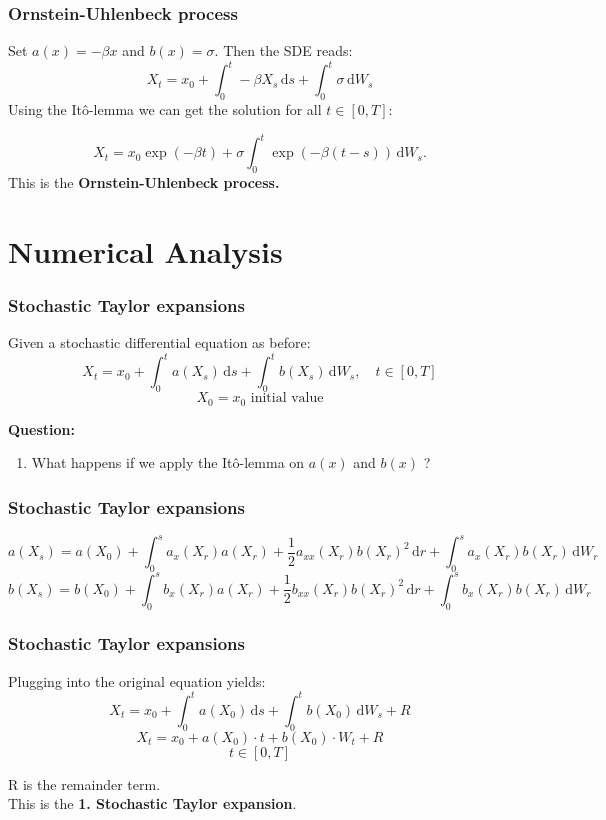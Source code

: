 \begin{frame}
\frametitle{Ornstein-Uhlenbeck process}
Set \(a(x) = -\beta x\) and \(b(x) = \sigma\). Then the SDE reads:
\[ X_t = x_0 + \int_0^t \!-\beta X_s\,\mathrm{d}s + \int_0^t \!\sigma\,\mathrm{d}W_{s}\]
Using the It\^o-lemma we can get the solution for all \(t\in[0,T]\):

\[X_t = x_0\exp({-\beta t}) + \sigma\int_0^t \!\exp({-\beta(t-s)})\,\mathrm{d}W_{s}.\]
This is the \textbf{Ornstein-Uhlenbeck process.}

\end{frame}



\section{Numerical Analysis} 

\begin{frame}
\frametitle{Stochastic Taylor expansions}
Given a stochastic differential equation as before:
\[X_t = x_0 + \int_0^t \!a(X_s)\,\mathrm{d}s + \int_0^t \!b(X_s)\,\mathrm{d}W_{s},\quad t\in [0,T]\]
\[X_0 = x_0\,\,\text{initial value}\]

\textbf{Question:}
\begin{enumerate}
\item What happens if we apply the It\^o-lemma on \(a(x)\) and \(b(x)\) ? 
\end{enumerate}
\end{frame}

\begingroup
\small
\begin{frame}
\frametitle{Stochastic Taylor expansions}
\[a(X_s) = a(X_0) + \int_0^s \!a_x(X_r)a(X_r) + \frac{1}{2}a_{xx}(X_r)b(X_r)^2\,\mathrm{d}r + \int_0^s \!a_x(X_r)b(X_r)\,\mathrm{d}W_{r}\]
\[b(X_s) = b(X_0) + \int_0^s \!b_x(X_r)a(X_r) + \frac{1}{2}b_{xx}(X_r)b(X_r)^2\,\mathrm{d}r + \int_0^s \!b_x(X_r)b(X_r)\,\mathrm{d}W_{r}\]
\end{frame}
\endgroup

\begin{frame}
\frametitle{Stochastic Taylor expansions}
Plugging into the original equation yields:
\[X_t = x_0 + \int_0^t \!a(X_0)\,\mathrm{d}s + \int_0^t \!b(X_0)\,\mathrm{d}W_{s} + R\]
\[X_t = x_0 + a(X_0)\cdot t + b(X_0)\cdot W_{t} + R\]
\[t\in [0,T]\]

R is the remainder term.\\
This is the \textbf{1. Stochastic Taylor expansion}.
\end{frame}


